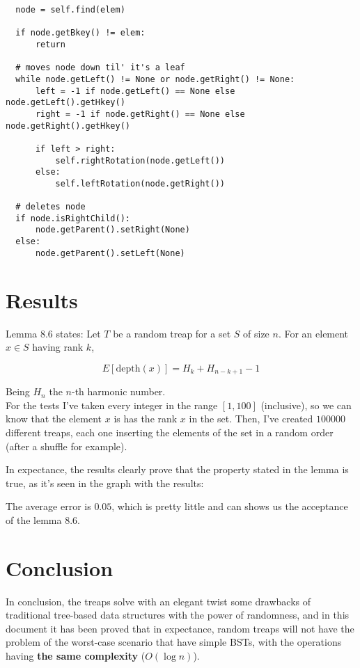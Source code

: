 \documentclass[a4paper,10pt]{article}
\begin{document}
\begin{lstlisting}
  node = self.find(elem)

  if node.getBkey() != elem:
      return

  # moves node down til' it's a leaf
  while node.getLeft() != None or node.getRight() != None:
      left = -1 if node.getLeft() == None else node.getLeft().getHkey()
      right = -1 if node.getRight() == None else node.getRight().getHkey()

      if left > right:
          self.rightRotation(node.getLeft())
      else:
          self.leftRotation(node.getRight())

  # deletes node
  if node.isRightChild():
      node.getParent().setRight(None)
  else:
      node.getParent().setLeft(None)
\end{lstlisting}
\section{Results}

Lemma 8.6 states: Let $T$ be a random treap for a set $S$ of size $n$. For an element $x \in S$ having rank $k$,

$$ E[\textrm{depth}(x)] = H_k + H_{n-k+1} -1 $$

Being $H_n$ the $n$-th harmonic number. \\

For the tests I've taken every integer in the range $[1,100]$ (inclusive), so we can know
that the element $x$ is has the rank $x$ in the set. Then, I've created $100000$ different
treaps, each one inserting the elements of the set in a random order (after a shuffle for example).

In expectance, the results clearly prove that the property stated in the lemma is true, as it's seen in the graph with the results:

\scalebox{0.7}{}

The average error is $0.05$, which is pretty little and can shows us the acceptance of the lemma 8.6.

\section{Conclusion}

In conclusion, the treaps solve with an elegant twist some drawbacks of traditional tree-based
data structures with the power of randomness, and in this document it has been proved that in expectance, random treaps will not have the problem of the worst-case scenario that have simple
BSTs, with the operations having \textbf{the same complexity} ($O(\log n)$).
\end{document}
